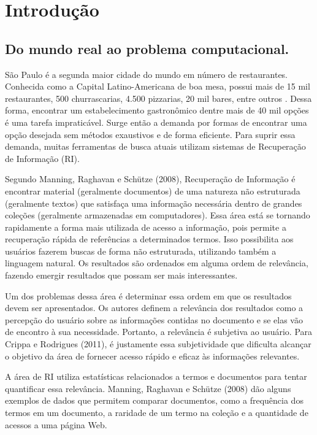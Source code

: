 \chapter{Introdução}
\label{cap:introducao}

\section*{Do mundo real ao problema computacional.}
\label{sec:real_computacional}

São Paulo é a segunda maior cidade do mundo em número de restaurantes. Conhecida como a Capital Latino-Americana de boa mesa, possui mais de 15 mil restaurantes, 500 churrascarias, 4.500 pizzarias, 20 mil bares, entre outros \cite{VisiteSaoPaulo}. Dessa forma, encontrar um estabelecimento gastronômico dentre mais de 40 mil opções é uma tarefa impraticável. Surge então a demanda por formas de encontrar uma opção desejada sem métodos exaustivos e de forma eficiente. Para suprir essa demanda, muitas ferramentas de busca atuais utilizam sistemas de Recuperação de Informação (RI).

Segundo Manning, Raghavan e Schütze (2008), Recuperação de Informação é encontrar material (geralmente documentos) de uma natureza não estruturada (geralmente textos) que satisfaça uma informação necessária dentro de grandes coleções (geralmente armazenadas em computadores). Essa área está se tornando rapidamente a forma mais utilizada de acesso a informação, pois permite a recuperação rápida de referências a determinados termos. Isso possibilita aos usuários fazerem buscas de forma não estruturada, utilizando também a linguagem natural. Os resultados são ordenados em alguma ordem de relevância, fazendo emergir resultados que possam ser mais interessantes.

Um dos problemas dessa área é determinar essa ordem em que os resultados devem ser apresentados. Os autores definem a relevância dos resultados como a percepção do usuário sobre as informações contidas no documento e se elas vão de encontro à sua necessidade. Portanto, a relevância é subjetiva ao usuário. Para Crippa e Rodrigues (2011), é justamente essa subjetividade que dificulta alcançar o objetivo da área de fornecer acesso rápido e eficaz às informações relevantes.

A área de RI utiliza estatísticas relacionados a termos e documentos para tentar quantificar essa relevância. Manning, Raghavan e Schütze (2008) dão alguns exemplos de dados que permitem comparar documentos, como a frequência dos termos em um documento, a raridade de um termo na coleção e a quantidade de acessos a uma página Web.

